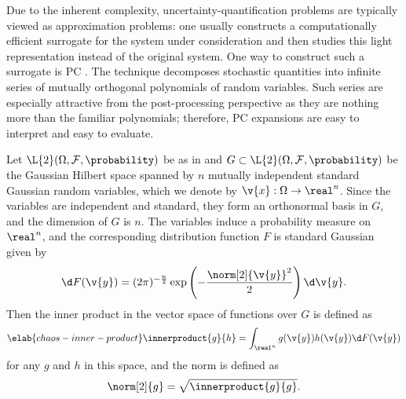Due to the inherent complexity, uncertainty-quantification problems are
typically viewed as approximation problems: one usually constructs a
computationally efficient surrogate for the system under consideration and then
studies this light representation instead of the original system. One way to
construct such a surrogate is \acf{PC} \cite{xiu2010}. The technique decomposes
stochastic quantities into infinite series of mutually orthogonal polynomials of
random variables. Such series are especially attractive from the post-processing
perspective as they are nothing more than the familiar polynomials; therefore,
\ac{PC} expansions are easy to interpret and easy to evaluate.

Let $\L{2}(\Omega, \mathcal{F}, \probability)$ be as in
 and $G \subset \L{2}(\Omega, \mathcal{F},
\probability)$ be the Gaussian Hilbert space \cite{janson1997} spanned by $n$
mutually independent standard Gaussian random variables, which we denote by
$\v{x}: \Omega \to \real^n$. Since the variables are independent and standard,
they form an orthonormal basis in $G$, and the dimension of $G$ is $n$. The
variables induce a probability measure on $\real^n$, and the corresponding
distribution function $F$ is standard Gaussian given by
\[
  \d F(\v{y}) = (2 \pi)^{-\frac{n}{2}} \exp\left(-\frac{\norm[2]{\v{y}}^2}{2}\right) \d \v{y}.
\]
Then the inner product in the vector space of functions over $G$ is defined as
\begin{equation} \elab{chaos-inner-product}
  \innerproduct{g}{h} = \int_{\real^n} g(\v{y}) h(\v{y}) \d F(\v{y})
\end{equation}
for any $g$ and $h$ in this space, and the norm is defined as
\[
  \norm[2]{g} = \sqrt{\innerproduct{g}{g}}.
\]

